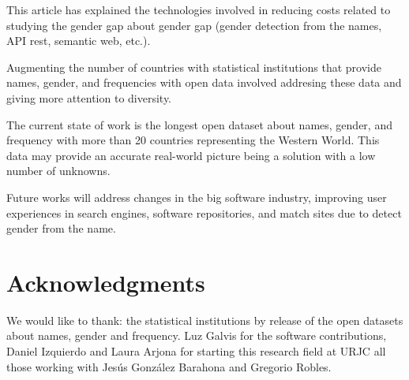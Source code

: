 \documentclass[a4paper]{article}
\begin{document}
This article has explained the technologies involved in reducing costs
related to studying the gender gap about gender gap (gender detection
from the names, API rest, semantic web, etc.).

Augmenting the number of countries with statistical institutions
that provide names, gender, and frequencies with open data
involved addresing these data and giving more attention to
diversity.

The current state of work is the longest open dataset about names,
gender, and frequency with more than 20 countries representing the
Western World. This data may provide an accurate real-world picture
being a solution with a low number of unknowns.

Future works will address changes in the big software industry,
improving user experiences in search engines, software repositories,
and match sites due to detect gender from the name.


\section*{Acknowledgments}

We would like to thank: the statistical institutions by
release of the open datasets about names, gender and frequency.
Luz Galvis for the software contributions, Daniel Izquierdo and
Laura Arjona for starting this research field at URJC all those
working with Jesús González Barahona and Gregorio Robles. 



\end{document}
